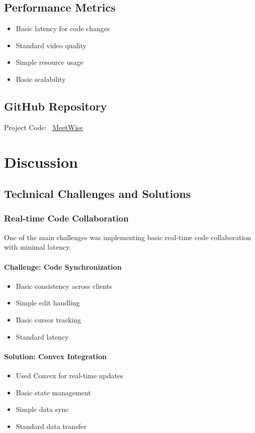 \documentclass[12pt,a4paper]{report}
\begin{document}
\section{Performance Metrics}
\begin{itemize}
   \item Basic latency for code changes
   \item Standard video quality
   \item Simple resource usage
   \item Basic scalability
\end{itemize}

\section{GitHub Repository}
Project Code: \faGithub \ \href{https://github.com/chotushikari/MeetWise.git}{MeetWise}

\chapter{Discussion}

\section{Technical Challenges and Solutions}

\subsection{Real-time Code Collaboration}
One of the main challenges was implementing basic real-time code collaboration with minimal latency.

\subsubsection{Challenge: Code Synchronization}
\begin{itemize}
   \item Basic consistency across clients
   \item Simple edit handling
   \item Basic cursor tracking
   \item Standard latency
\end{itemize}

\subsubsection{Solution: Convex Integration}
\begin{itemize}
   \item Used Convex for real-time updates
   \item Basic state management
   \item Simple data sync
   \item Standard data transfer
\end{itemize}
\end{document}
